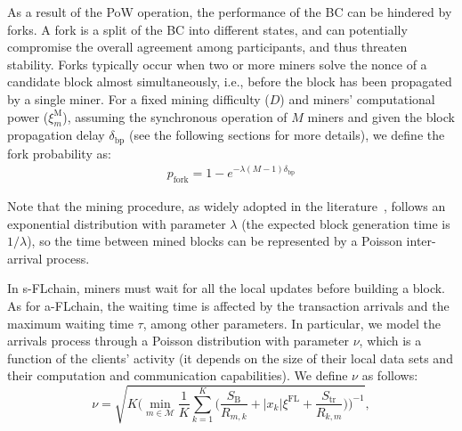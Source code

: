 \documentclass[10pt,journal,compsoc]{IEEEtran}
\begin{document}
As a result of the PoW operation, the performance of the BC can be hindered by forks. A fork is a split of the BC into different states, and can potentially compromise the overall agreement among participants, and thus threaten stability. Forks typically occur when two or more miners solve the nonce of a candidate block almost simultaneously, i.e., before the block has been propagated by a single miner. For a fixed mining difficulty ($D$) and miners' computational power ($\xi_m^\text{M}$), assuming the synchronous operation of $M$ miners and given the block propagation delay $\delta_\text{bp}$ (see the following sections for more details), we define the fork probability as:
\begin{equation}
\begin{split}
p_\text{fork} = 1 - e^{-\lambda(M-1)\delta_\text{bp}}
\end{split}
\label{eq:fork_probability}
\end{equation}

Note that the mining procedure, as widely adopted in the literature~\cite{decker2013information}, follows an exponential distribution with parameter $\lambda$ (the expected block generation time is $1/\lambda$), so the time between mined blocks can be represented by a Poisson inter-arrival process. %

In s-FLchain, miners must wait for all the local updates before building a block. As for a-FLchain, the waiting time is affected by the transaction arrivals and the maximum waiting time $\tau$, among other parameters. In particular, we model the arrivals process through a Poisson distribution with parameter $\nu$, which is a function of the clients' activity (it depends on the size of their local data sets and their computation and communication capabilities). We define $\nu$ as follows:%
\begin{equation}
\nu = \sqrt{K \Bigg( \min_{m\in \mathcal{M}} \frac{1}{K} \sum_{k=1}^{K} \Big( \frac{S_\text{B}}{R_{m,k}} + |x_k|\xi^\text{FL} + \frac{S_\text{tr}}{R_{k,m}} \Big) \Bigg)^{-1}},
\end{equation}
\end{document}
